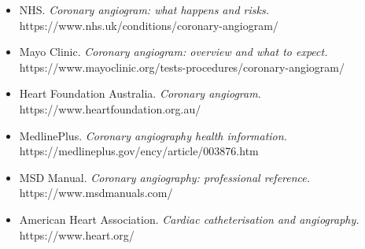 \begin{itemize}
    \item NHS. \textit{Coronary angiogram: what happens and risks.} https://www.nhs.uk/conditions/coronary-angiogram/
    \item Mayo Clinic. \textit{Coronary angiogram: overview and what to expect.} https://www.mayoclinic.org/tests-procedures/coronary-angiogram/
    \item Heart Foundation Australia. \textit{Coronary angiogram.} https://www.heartfoundation.org.au/
    \item MedlinePlus. \textit{Coronary angiography health information.} https://medlineplus.gov/ency/article/003876.htm
    \item MSD Manual. \textit{Coronary angiography: professional reference.} https://www.msdmanuals.com/
    \item American Heart Association. \textit{Cardiac catheterisation and angiography.} https://www.heart.org/
\end{itemize}
